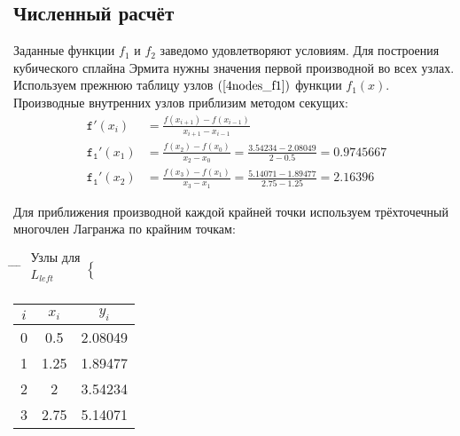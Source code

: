 \documentclass[a4paper, 14pt]{article}
\begin{document}
\subsection{Численный расчёт}

Заданные функции $f_1$ и $f_2$ заведомо удовлетворяют условиям. Для построения кубического сплайна Эрмита нужны значения первой производной во всех узлах. Используем прежнюю таблицу узлов $(\ref{4nodes_f1})$ функции $f_1(x)$. Производные внутренних узлов приблизим методом секущих:
\begin{align}
    \mathtt{f'}(x_i) &= \frac{f(x_{i+1})-f(x_{i-1})}{x_{i+1}-x_{i-1}} \\
    \mathtt{f_1'}(x_1) &= \frac{f(x_2)-f(x_0)}{x_2-x_0}=\frac{3.54234-2.08049}{2-0.5}=0.9745667 \\
    \mathtt{f_1'}(x_2) &= \frac{f(x_3)-f(x_1)}{x_3-x_1}=\frac{5.14071-1.89477}{2.75-1.25}=2.16396
\end{align}

Для приближения производной каждой крайней точки используем трёхточечный многочлен Лагранжа по крайним точкам:
\begin{tabbing}
    \hspace*{5cm}\= \hspace*{1.7cm} \= \hspace*{3cm} \= \kill
    \>
    $\begin{smallmatrix}
        \text{Узлы для}\\
        L_{left}\\
    \end{smallmatrix}
    \begin{cases}
        \\\\
    \end{cases}$
    \>
    \begin{tabular}{|c|c|c|}
        \hline
        $i$ & $x_i$ & $y_i$ \\
        \hline
        0 & 0.5 & 2.08049 \\
        \hline
        1 & 1.25 & 1.89477 \\
        \hline
        2 & 2 & 3.54234 \\
        \hline
        3 & 2.75 & 5.14071 \\
        \hline
    \end{tabular}
    \>
\end{tabbing}
\end{document}
